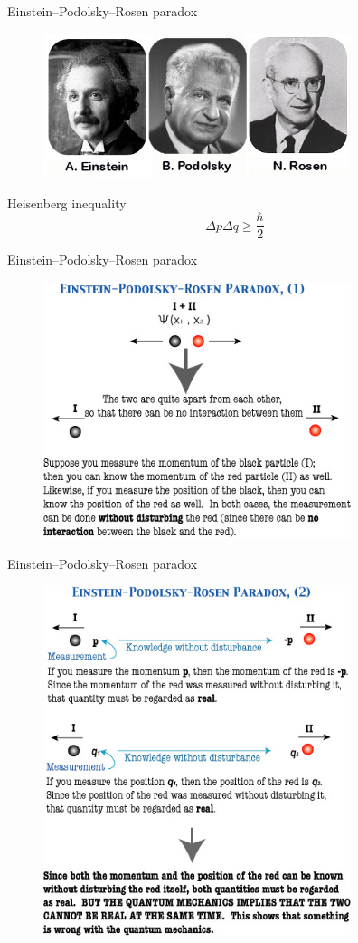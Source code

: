\documentclass[10pt,pdf,hyperref={unicode}]{beamer}
\begin{document}
\begin{frame}{Einstein–Podolsky–Rosen paradox}
 \begin{figure} 
   \includegraphics[width=90mm,scale=0.5]{epr.jpg}
  \end{figure}
\end{frame}

\begin{frame}{Heisenberg inequality}
  \[
  \Delta p \Delta q \ge \frac{\hbar}{2}
  \]
\end{frame}

\begin{frame}{Einstein–Podolsky–Rosen paradox}
 \begin{figure} 
   \includegraphics[width=90mm,scale=0.5]{epr1.jpg}
  \end{figure}
\end{frame}

\begin{frame}{Einstein–Podolsky–Rosen paradox}
 \begin{figure} 
   \includegraphics[width=90mm,scale=0.5]{epr2.jpg}
  \end{figure}
\end{frame}
\end{document}
